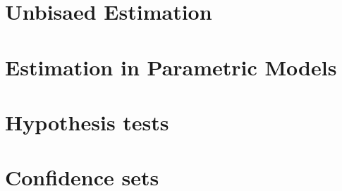 \section{Unbisaed Estimation}

\section{Estimation in Parametric Models}


\section{Hypothesis tests}

\section{Confidence sets}

